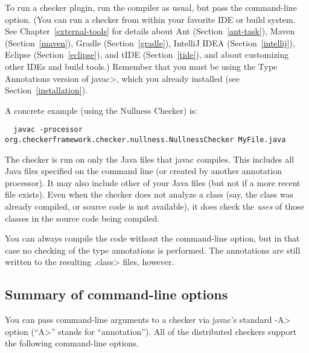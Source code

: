 To run a checker plugin, run the compiler  as usual,
but pass the  command-line
option.
(You can run a checker from within your favorite IDE or build system.  See
Chapter~\ref{external-tools} for details about
Ant (Section~\ref{ant-task}),
Maven (Section~\ref{maven}),
Gradle (Section~\ref{gradle}),
IntelliJ IDEA (Section~\ref{intellij}),
Eclipse (Section~\ref{eclipse}),
and
tIDE (Section~\ref{tide}), and about customizing other IDEs and build tools.)
Remember that you must be using the
Type Annotations version of \<javac>, which you already installed (see Section~\ref{installation}).

A concrete example (using the Nullness Checker) is:

\begin{smaller}
\begin{Verbatim}
  javac -processor org.checkerframework.checker.nullness.NullnessChecker MyFile.java
\end{Verbatim}
\end{smaller}

The checker is run on only the Java files that javac compiles.
This includes all Java files specified on the command line (or
created by another annotation processor).  It may also include other of
your Java files (but not if a more recent  file exists).
Even when the checker does not analyze a class (say, the class was
already compiled, or source code is not available), it does check
the \emph{uses} of those classes in the source code being compiled.

You can always compile the code without the 
command-line option, but in that case no checking of the type
annotations is performed.  The annotations are still written to the
resulting \<.class> files, however.



\subsection{Summary of command-line options\label{checker-options}}

You can pass command-line arguments to a checker via javac's standard \<-A>
option (``\<A>'' stands for ``annotation'').  All of the distributed
checkers support the following command-line options.

